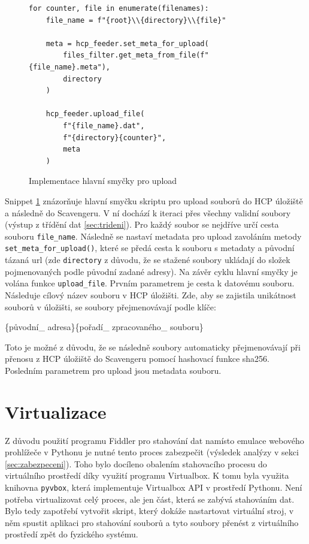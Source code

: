 \documentclass[thesis=M,czech,hidelinks]{FITthesis}[2013/05/06]
\begin{document}
\begin{figure}[h]               
	\begin{verbatim}
for counter, file in enumerate(filenames):
    file_name = f"{root}\\{directory}\\{file}"
	
    meta = hcp_feeder.set_meta_for_upload(
        files_filter.get_meta_from_file(f"{file_name}.meta"),
        directory
    )
	
    hcp_feeder.upload_file(
        f"{file_name}.dat",
        f"{directory}{counter}",
        meta
    )
	\end{verbatim}      
	\caption{Implementace hlavní smyčky pro upload}
	\label{snip:mainupload}
\end{figure}

Snippet \ref{snip:mainupload} znázorňuje hlavní smyčku skriptu pro upload souborů do HCP úložiště a následně do Scavengeru. V ní dochází k iteraci přes všechny validní soubory (výstup z třídění dat \ref{sec:trideni}). Pro každý soubor se nejdříve určí cesta souboru \texttt{file_name}. Následně se nastaví metadata pro upload zavoláním metody \texttt{set_meta_for_upload()}, které se předá cesta k souboru s metadaty a původní tázaná url (zde \texttt{directory} z důvodu, že se stažené soubory ukládají do složek pojmenovaných podle původní zadané adresy). Na závěr cyklu hlavní smyčky je volána funkce \texttt{upload_file}. Prvním parametrem je cesta k datovému souboru. Následuje cílový název souboru v HCP úložišti. Zde, aby se zajistila unikátnost souborů v úložišti, se soubory přejmenovávají podle klíče:
\begin{center}\label{prejmenovavani}
\{původní\_ adresa\}\{pořadí\_ zpracovaného\_ souboru\}
\end{center}

 Toto je možné z důvodu, že se následně soubory automaticky přejmenovávají při přenosu z HCP úložiště do Scavengeru pomocí hashovací funkce sha256. Posledním parametrem pro upload jsou metadata souboru.

\section{Virtualizace}
Z důvodu použití programu Fiddler pro stahování dat namísto emulace webového prohlížeče v Pythonu je nutné tento proces zabezpečit (výsledek analýzy v sekci \ref{sec:zabezpeceni}). Toho bylo docíleno obalením stahovacího procesu do virtuálního prostředí díky využití programu Virtualbox. K tomu byla využita knihovna \texttt{pyvbox}\cite{pyvbox}, která implementuje Virtualbox API v prostředí Pythonu. Není potřeba virtualizovat celý proces, ale jen část, která se zabývá stahováním dat. Bylo tedy zapotřebí vytvořit skript, který dokáže nastartovat virtuální stroj, v něm spustit aplikaci pro stahování souborů a tyto soubory přenést z virtuálního prostředí zpět do fyzického systému.
\end{document}
